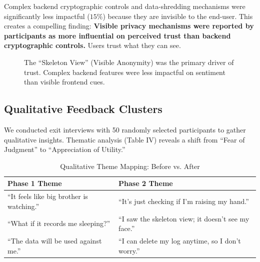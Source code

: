 \documentclass[conference]{IEEEtran}
\begin{document}
Complex backend cryptographic controls and data-shredding mechanisms were significantly less impactful ($15\%$) because they are invisible to the end-user. This creates a compelling finding: \textbf{Visible privacy mechanisms were reported by participants as more influential on perceived trust than backend cryptographic controls.} Users trust what they can see.

\begin{figure}[htbp]
\centering
{}
\caption{The ``Skeleton View'' (Visible Anonymity) was the primary driver of trust. Complex backend features were less impactful on sentiment than visible frontend cues.}
\label{fig:factors}
\end{figure}

\subsection{Qualitative Feedback Clusters}
We conducted exit interviews with 50 randomly selected participants to gather qualitative insights. Thematic analysis (Table IV) reveals a shift from ``Fear of Judgment'' to ``Appreciation of Utility.''

\begin{table}[htbp]
\caption{Qualitative Theme Mapping: Before vs. After}
\begin{center}
\begin{tabular}{|p{3cm}|p{4.5cm}|}
\hline
\textbf{Phase 1 Theme} & \textbf{Phase 2 Theme} \\
\hline
``It feels like big brother is watching.'' & ``It's just checking if I'm raising my hand.'' \\
\hline
``What if it records me sleeping?'' & ``I saw the skeleton view; it doesn't see my face.'' \\
\hline
``The data will be used against me.'' & ``I can delete my log anytime, so I don't worry.'' \\
\hline
\end{tabular}
\end{center}
\label{tab:themes}
\end{table}
\end{document}
